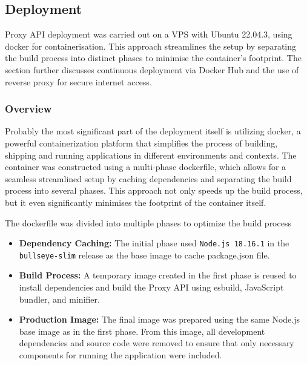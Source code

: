 \subsection{Deployment}
\label{subsec:deployment}


Proxy API deployment was carried out on a \ac{VPS} with Ubuntu 22.04.3, using \gls{docker} for containerisation.
This approach streamlines the setup by separating the build process into distinct phases to minimise the container's footprint.
The section further discusses continuous deployment via Docker Hub and the use of reverse proxy for secure internet access.

\subsubsection{Overview}
Probably the most significant part of the deployment itself is utilizing \gls{docker}, a powerful containerization platform that simplifies the process of building, shipping and running applications in different environments and contexts. 
The container was constructed using a multi-phase \gls{dockerfile}, which allows for a seamless streamlined setup by caching dependencies and separating the build process into several phases.
This approach not only speeds up the build process, but it even significantly minimises the footprint of the container itself.


The \gls{dockerfile} was divided into multiple phases to optimize the build process
\begin{itemize}
    \item \textbf{Dependency Caching:} The initial phase used \texttt{Node.js 18.16.1} in the \texttt{bullseye-slim} release as the base image to cache package.json file.
    \item \textbf{Build Process:} A temporary image created in the first phase is reused to install dependencies and build the Proxy API using \gls{esbuild}, JavaScript bundler, and minifier. 
    \item \textbf{Production Image:} The final image was prepared using the same Node.js base image as in the first phase. From this image, all development dependencies and source code were removed to ensure that only necessary components for running the application were included.
\end{itemize}

